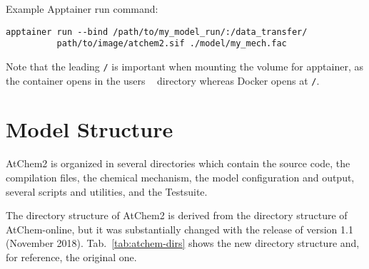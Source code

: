 Example Apptainer run command:

\begin{verbatim}
apptainer run --bind /path/to/my_model_run/:/data_transfer/
          path/to/image/atchem2.sif ./model/my_mech.fac
\end{verbatim}

Note that the leading \texttt{/} is important when mounting the volume
for apptainer, as the container opens in the users \texttt{~}
directory whereas Docker opens at \texttt{/}.

\section{Model Structure} \label{sec:model-structure}

AtChem2 is organized in several directories which contain the source
code, the compilation files, the chemical mechanism, the model
configuration and output, several scripts and utilities, and the Testsuite.

The directory structure of AtChem2 is derived from the directory
structure of AtChem-online, but it was substantially changed with the
release of version 1.1 (November 2018). Tab.~\ref{tab:atchem-dirs}
shows the new directory structure and, for reference, the original
one.

